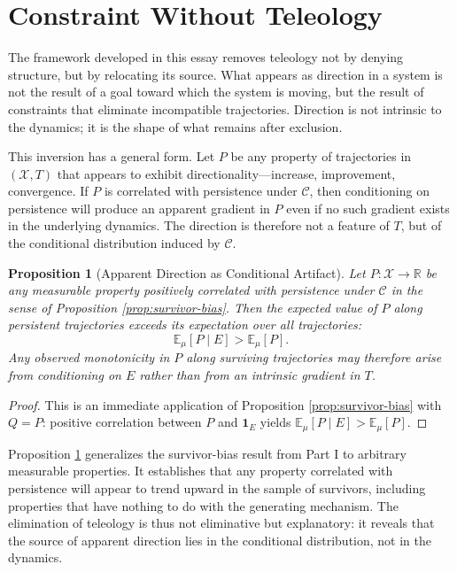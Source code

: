 \documentclass[12pt, a4paper, oneside]{article}
\theoremstyle{plain}
\newtheorem{proposition}[theorem]{Proposition}
\theoremstyle{definition}
\theoremstyle{remark}
\newcommand{\X}{\mathcal{X}}
\newcommand{\C}{\mathcal{C}}
\newcommand{\T}{T}
\begin{document}
\setcounter{section}{17}

\section{Constraint Without Teleology}

The framework developed in this essay removes teleology not by denying structure, but by relocating its source. What appears as direction in a system is not the result of a goal toward which the system is moving, but the result of constraints that eliminate incompatible trajectories. Direction is not intrinsic to the dynamics; it is the shape of what remains after exclusion.

This inversion has a general form. Let $P$ be any property of trajectories in $(\X, \T)$ that appears to exhibit directionality---increase, improvement, convergence. If $P$ is correlated with persistence under $\C$, then conditioning on persistence will produce an apparent gradient in $P$ even if no such gradient exists in the underlying dynamics. The direction is therefore not a feature of $\T$, but of the conditional distribution induced by $\C$.

\begin{proposition}[Apparent Direction as Conditional Artifact]
\label{prop:direction}
Let $P : \X \to \mathbb{R}$ be any measurable property positively correlated with persistence under $\C$ in the sense of Proposition \ref{prop:survivor-bias}. Then the expected value of $P$ along persistent trajectories exceeds its expectation over all trajectories:
\begin{equation}
\mathbb{E}_\mu[P \mid E] > \mathbb{E}_\mu[P].
\end{equation}
Any observed monotonicity in $P$ along surviving trajectories may therefore arise from conditioning on $E$ rather than from an intrinsic gradient in $\T$.
\end{proposition}

\begin{proof}
This is an immediate application of Proposition \ref{prop:survivor-bias} with $Q = P$: positive correlation between $P$ and $\mathbf{1}_E$ yields $\mathbb{E}_\mu[P \mid E] > \mathbb{E}_\mu[P]$.
\end{proof}

Proposition \ref{prop:direction} generalizes the survivor-bias result from Part I to arbitrary measurable properties. It establishes that any property correlated with persistence will appear to trend upward in the sample of survivors, including properties that have nothing to do with the generating mechanism. The elimination of teleology is thus not eliminative but explanatory: it reveals that the source of apparent direction lies in the conditional distribution, not in the dynamics.
\end{document}

